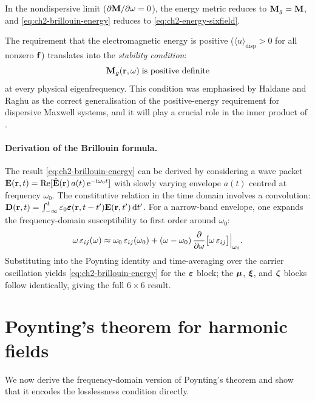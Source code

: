 \begin{remark}
In the nondispersive limit ($\partial\mathbf{M}/\partial\omega=0$), the
energy metric reduces to $\mathbf{M}_g=\mathbf{M}$, and
\eqref{eq:ch2-brillouin-energy} reduces to
\eqref{eq:ch2-energy-sixfield}.
\end{remark}

The requirement that the electromagnetic energy is positive
($\langle u\rangle_\mathrm{disp}>0$ for all nonzero $\mathbf{f}$)
translates into the \emph{stability condition}:
\begin{equation}\label{eq:ch2-stability}
  \mathbf{M}_g(\mathbf{r},\omega)\;\text{is positive definite}
\end{equation}
at every physical eigenfrequency.  This condition was emphasised by
Haldane and Raghu as the correct generalisation of the positive-energy
requirement for dispersive Maxwell systems, and it will play a crucial
role in the inner product of .

\paragraph{Derivation of the Brillouin formula.}
The result \eqref{eq:ch2-brillouin-energy} can be derived by
considering a wave packet
$\mathbf{E}(\mathbf{r},t)=\mathrm{Re}[\hat{\mathbf{E}}(\mathbf{r})\,a(t)\,\mathrm{e}^{-\mathrm{i}\omega_0 t}]$
with slowly varying envelope $a(t)$ centred at frequency $\omega_0$.
The constitutive relation in the time domain involves a convolution:
$\mathbf{D}(\mathbf{r},t)=\int_{-\infty}^{t}\varepsilon_0\boldsymbol{\varepsilon}(\mathbf{r},t-t')
\mathbf{E}(\mathbf{r},t')\,\mathrm{d} t'$.  For a narrow-band envelope, one expands
the frequency-domain susceptibility to first order around $\omega_0$:
\begin{equation}
  \omega\,\varepsilon_{ij}(\omega)
  \approx \omega_0\,\varepsilon_{ij}(\omega_0)
  + (\omega-\omega_0)\,
  \frac{\partial }{\partial \omega}\bigl[\omega\,\varepsilon_{ij}\bigr]
  \Big|_{\omega_0}.
\end{equation}
Substituting into the Poynting identity and time-averaging over the
carrier oscillation yields \eqref{eq:ch2-brillouin-energy} for the
$\boldsymbol{\varepsilon}$ block; the $\boldsymbol{\mu}$, $\boldsymbol{\xi}$, and $\boldsymbol{\zeta}$ blocks follow
identically, giving the full $6\times 6$ result.

\section{Poynting's theorem for harmonic fields}
\label{sec:ch2-poynting}

We now derive the frequency-domain version of Poynting's theorem and
show that it encodes the losslessness condition directly.

